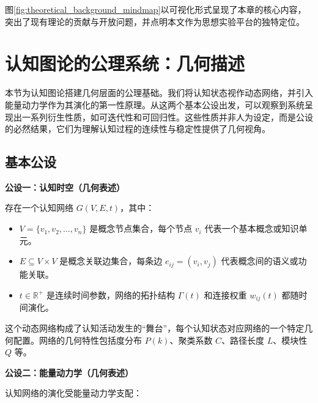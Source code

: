 \documentclass[12pt,a4paper]{article}
\begin{document}
图\ref{fig:theoretical_background_mindmap}以可视化形式呈现了本章的核心内容，突出了现有理论的贡献与开放问题，并点明本文作为思想实验平台的独特定位。


\section{认知图论的公理系统：几何描述}

本节为认知图论搭建几何层面的公理基础。我们将认知状态视作动态网络，并引入能量动力学作为其演化的第一性原理。从这两个基本公设出发，可以观察到系统呈现出一系列衍生性质，如可迭代性和可回归性。这些性质并非人为设定，而是公设的必然结果，它们为理解认知过程的连续性与稳定性提供了几何视角。

\subsection{基本公设}

\textbf{公设一：认知时空（几何表述）}

存在一个认知网络 $G(V,E,t)$，其中：
\begin{itemize}
\item $V = \{v_1, v_2, \ldots, v_n\}$ 是概念节点集合，每个节点 $v_i$ 代表一个基本概念或知识单元。
\item $E \subseteq V \times V$ 是概念关联边集合，每条边 $e_{ij} = (v_i, v_j)$ 代表概念间的语义或功能关联。
\item $t \in \mathbb{R}^+$ 是连续时间参数，网络的拓扑结构 $\Gamma(t)$ 和连接权重 $w_{ij}(t)$ 都随时间演化。
\end{itemize}

这个动态网络构成了认知活动发生的“舞台”，每个认知状态对应网络的一个特定几何配置。网络的几何特性包括度分布 $P(k)$、聚类系数 $C$、路径长度 $L$、模块性 $Q$ 等。

\textbf{公设二：能量动力学（几何表述）}

认知网络的演化受能量动力学支配：
\end{document}
